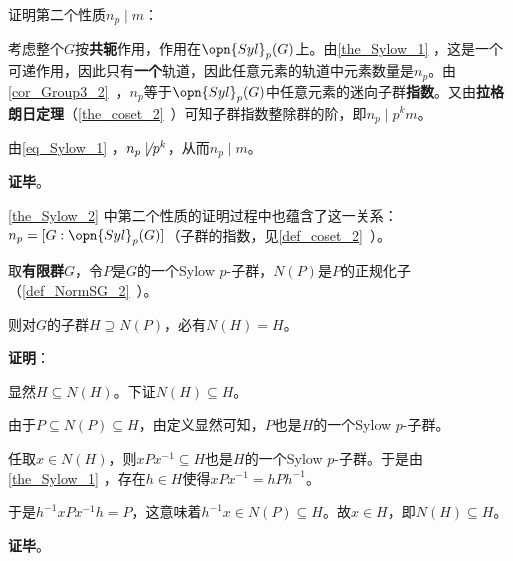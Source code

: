 证明第二个性质$n_p\mid m$：

考虑整个$G$按\textbf{共轭}作用，作用在$\opn{Syl}_p(G)$上。由\autoref{the_Sylow_1} ，这是一个可递作用，因此只有\textbf{一个}轨道，因此任意元素的轨道中元素数量是$n_p$。由\autoref{cor_Group3_2}~，$n_p$等于$\opn{Syl}_p(G)$中任意元素的迷向子群\textbf{指数}。又由\textbf{拉格朗日定理}（\autoref{the_coset_2}~）可知子群指数整除群的阶，即$n_p\mid p^km$。

由\autoref{eq_Sylow_1} ，$n_p\not \mid p^k$，从而$n_p\mid m$。


\textbf{证毕}。

\autoref{the_Sylow_2} 中第二个性质的证明过程中也蕴含了这一关系：$n_p=[G:\opn{Syl}_p(G)]$（子群的指数，见\autoref{def_coset_2}~）。


\begin{theorem}{}
取\textbf{有限群}$G$，令$P$是$G$的一个Sylow $p$-子群，$N(P)$是$P$的正规化子（\autoref{def_NormSG_2}~）。

则对$G$的子群$H\supseteq N(P)$，必有$N(H)=H$。
\end{theorem}

\textbf{证明}：

显然$H\subseteq N(H)$。下证$N(H)\subseteq H$。

由于$P\subseteq N(P)\subseteq H$，由定义显然可知，$P$也是$H$的一个Sylow $p$-子群。

任取$x\in N(H)$，则$xPx^{-1}\subseteq H$也是$H$的一个Sylow $p$-子群。于是由\autoref{the_Sylow_1} ，存在$h\in H$使得$xPx^{-1}=hPh^{-1}$。

于是$h^{-1}xPx^{-1}h=P$，这意味着$h^{-1}x\in N(P)\subseteq H$。故$x\in H$，即$N(H)\subseteq H$。

\textbf{证毕}。














